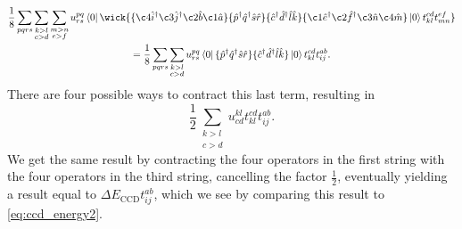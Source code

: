 \begin{equation}
    \begin{gathered}
    \frac{1}{8}\sum_{pqrs}\sum_{\substack{k>l \\ c>d}} \sum_{\substack{m>n \\ e>f}}
    u^{pq}_{rs} \bra{0}
      \wick{ 
            \{\c4{\hat{i}}^\dagger \c3{\hat{j}}^\dagger \c2{\hat{b}} \c1{\hat{a}} \}
            \{\hat{p}^\dagger \hat{q}^\dagger \hat{s} \hat{r} \}
            \{\hat{c}^\dagger \hat{d}^\dagger \hat{l} \hat{k} \}
            \{\c1{\hat{e}}^\dagger \c2{\hat{f}}^\dagger \c3{\hat{n}} \c4{\hat{m}} \}
        \ket{0} t^{cd}_{kl} t^{ef}_{mn}
        } \\
    =
    \frac{1}{8}\sum_{pqrs}\sum_{\substack{k>l \\ c>d}}
    u^{pq}_{rs} \bra{0}
        \{\hat{p}^\dagger \hat{q}^\dagger \hat{s} \hat{r} \}
        \{\hat{c}^\dagger \hat{d}^\dagger \hat{l} \hat{k} \}
    \ket{0} t^{cd}_{kl} t^{ab}_{ij}.
    \end{gathered}
\end{equation}
There are four possible ways to contract this last term, resulting in
\begin{equation}
    \frac{1}{2}\sum_{\substack {k>l \\ c >d }}
        u^{kl}_{cd} t^{cd}_{kl} t^{ab}_{ij}.
\end{equation}
We get the same result by contracting the four operators in the first 
string with the four operators in the third string, cancelling the
factor $\frac{1}{2}$, eventually yielding a result equal to
$\Delta E_{\text{CCD}} t^{ab}_{ij}$, which we see by 
comparing this result to \autoref{eq:ccd_energy2}.

